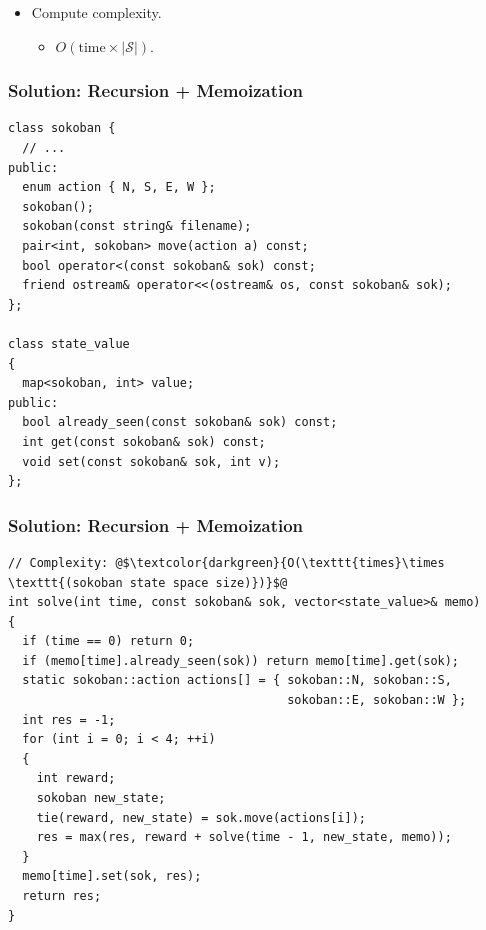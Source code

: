 \documentclass{beamer}
\begin{document}
\begin{frame}
\begin{itemize}
\vspace{0.1cm}

\item<11-> Compute complexity.
\begin{itemize}
\scriptsize
\item<12-> $O(\textrm{time}\times |\mathcal{S}|)$.
\end{itemize}

\end{itemize}

\end{frame}

\fi

\begin{frame}[containsverbatim]
\frametitle{Solution: Recursion + Memoization}

\scriptsize
\begin{lstlisting}
class sokoban {
  // ...
public:
  enum action { N, S, E, W };
  sokoban();
  sokoban(const string& filename);
  pair<int, sokoban> move(action a) const;
  bool operator<(const sokoban& sok) const;
  friend ostream& operator<<(ostream& os, const sokoban& sok);
};

class state_value
{
  map<sokoban, int> value;
public:
  bool already_seen(const sokoban& sok) const;
  int get(const sokoban& sok) const;
  void set(const sokoban& sok, int v);
};
\end{lstlisting}

\end{frame}

\begin{frame}[containsverbatim]
\frametitle{Solution: Recursion + Memoization}

\scriptsize
\begin{lstlisting}
// Complexity: @$\textcolor{darkgreen}{O(\texttt{times}\times \texttt{(sokoban state space size)})}$@
int solve(int time, const sokoban& sok, vector<state_value>& memo)
{
  if (time == 0) return 0;
  if (memo[time].already_seen(sok)) return memo[time].get(sok);
  static sokoban::action actions[] = { sokoban::N, sokoban::S,
                                       sokoban::E, sokoban::W };
  int res = -1;
  for (int i = 0; i < 4; ++i)
  {
    int reward;
    sokoban new_state;
    tie(reward, new_state) = sok.move(actions[i]);
    res = max(res, reward + solve(time - 1, new_state, memo));
  }
  memo[time].set(sok, res);
  return res;
}
\end{lstlisting}

\end{frame}
\end{document}
